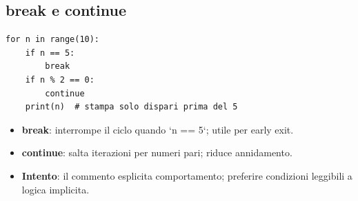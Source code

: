 \subsection{break e continue}
\label{subsec:cf-break-continue}
\begin{lstlisting}
for n in range(10):
    if n == 5:
        break
    if n % 2 == 0:
        continue
    print(n)  # stampa solo dispari prima del 5
\end{lstlisting}
\begin{tcolorbox}[title=Spiegazione del codice]
\begin{itemize}
  \item \textbf{break}: interrompe il ciclo quando `n == 5`; utile per early exit.
  \item \textbf{continue}: salta iterazioni per numeri pari; riduce annidamento.
  \item \textbf{Intento}: il commento esplicita comportamento; preferire condizioni leggibili a logica implicita.
\end{itemize}
\end{tcolorbox}
